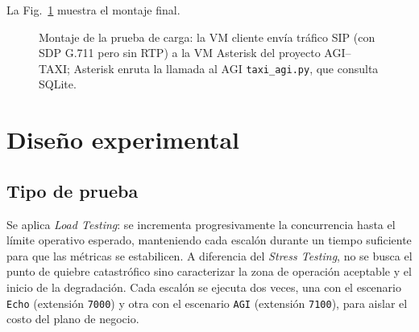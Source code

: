 \documentclass[conference]{IEEEtran}
\begin{document}
La Fig.~\ref{fig:arquitectura} muestra el montaje final.

\begin{figure}[H]
\centering
{}
\caption{Montaje de la prueba de carga: la VM cliente env\'ia tr\'afico SIP (con SDP G.711 pero sin RTP) a la VM Asterisk del proyecto AGI--TAXI; Asterisk enruta la llamada al AGI \texttt{taxi\_agi.py}, que consulta SQLite.}
\label{fig:arquitectura}
\end{figure}

\section{Dise\~no experimental}

\subsection{Tipo de prueba}

Se aplica \textit{Load Testing}: se incrementa progresivamente la
concurrencia hasta el l\'imite operativo esperado, manteniendo cada
escal\'on durante un tiempo suficiente para que las m\'etricas se
estabilicen. A diferencia del \textit{Stress Testing}, no se busca el
punto de quiebre catastr\'ofico sino caracterizar la zona de
operaci\'on aceptable y el inicio de la degradaci\'on. Cada escal\'on
se ejecuta dos veces, una con el escenario \texttt{Echo} (extensi\'on
\texttt{7000}) y otra con el escenario \texttt{AGI} (extensi\'on
\texttt{7100}), para aislar el costo del plano de negocio.
\end{document}
